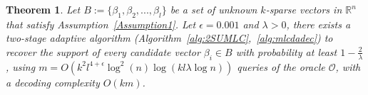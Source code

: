 \documentclass[10pt,a4paper]{amsart}
\newcommand\mc{\mathcal}
\newtheorem{theorem}{Theorem}[section]
\newcommand{\supp}{\mathrm{supp}}
\begin{document}
\begin{theorem}\label{thm1}
    Let $B:=\{\beta_1,\beta_2,...,\beta_l\}$ be a set of unknown $k$-sparse vectors in $\mathbb{R}^n$ that satisfy Assumption~\ref{Assumption1}. Let $\epsilon=0.001$ and $\lambda>0$, there exists a two-stage adaptive algorithm (Algorithm~\ref{alg:2SUMLC},~\ref{alg:mlcdadec}) to recover the support of every candidate vector $\beta_i\in B$ with probability at least $1 - \frac{2}{\lambda}$, using $m=O(k^2l^{4+\epsilon}\log^2 (n)\log (kl\lambda\log n))$ queries of the oracle $\mc{O}$, with a decoding  complexity $O(km)$.
\end{theorem}





    




\end{document}
